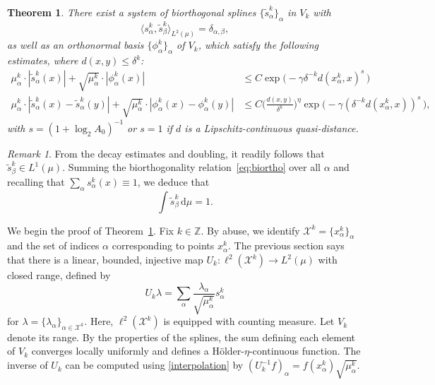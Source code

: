 \documentclass{amsart}
\numberwithin{equation}{section}
\theoremstyle{plain}
\newtheorem{theorem}[equation]{Theorem}
\theoremstyle{definition}
\theoremstyle{remark}
\newtheorem{remark}[equation]{Remark}
\begin{document}
{{\begin{theorem}\label{thm:biortho}
There exist a system of biorthogonal splines $\{\tilde{s}^k_\alpha\}_\alpha$ in $V_k$ with
\begin{equation}\label{eq:biortho}
\langle s^k_{\alpha}, \tilde s^k_{\beta}\rangle_{L^2(\mu)}= \delta _{\alpha,\beta},
\end{equation}
as well as an orthonormal basis $\{\phi^k_\alpha\}_\alpha$ of $V_k$, which satisfy the following estimates, 
where 
$d(x,y)\leq\delta^k$:
\begin{equation*}
\begin{split}
  \mu^k_{\alpha}\cdot{|{\tilde s^k_{\alpha}(x)}|}
  +\sqrt{\mu^k_{\alpha}}\cdot{|{\phi^k_{\alpha}(x)}|}
  &\leq C\exp\big(-\gamma {{\delta^{-k}}{d(x^k_{\alpha},x)}}^s\, \big) \\
  \mu^k_{\alpha}\cdot{|{\tilde s^k_{\alpha}(x)-\tilde s^k_\alpha(y)}|}
  +\sqrt{\mu^k_{\alpha}}\cdot{|{\phi^k_{\alpha}(x)-\phi^k_\alpha(y)}|}
  &\leq C\Big(\frac{d(x,y)}{\delta^k}\Big)^{\eta} \exp\big( -\gamma (\delta ^{-k}{d(x^k_{\alpha},x)})^s\, \big),
\end{split}
\end{equation*}
with  $s=(1+\log_{2}A_{0})^{-1}$ or $s=1$ if $d$ is a Lipschitz-continuous quasi-distance.
\end{theorem}

\begin{remark}
From the decay estimates and doubling, it readily follows that $\tilde{s}^k_\beta\in L^1(\mu)$. Summing the biorthogonality relation~\eqref{eq:biortho} over all $\alpha$ and recalling that $\sum_\alpha s^k_\alpha(x)\equiv 1$, we deduce that
\begin{equation*}
  \int \tilde{s}^k_\beta{\,\mathrm{d}}\mu = 1.
\end{equation*}
\end{remark}

We begin the proof of Theorem~\ref{thm:biortho}. Fix $k\in{\mathbb{Z}}$. By abuse, we identify $\mathscr{X}^k=\{x^k_{\alpha}\}_{\alpha}$ and the set of indices $\alpha$ corresponding to points $x^k_{\alpha}$. The previous section says that there is a linear,  bounded, injective map
$U_{k}\colon\ell^2(\mathscr{X}^{k}) \to L^2(\mu)$  with closed range, defined by \begin{equation*}U_{k}\lambda= \sum_{\alpha} \frac{\lambda_{\alpha}}{\sqrt {\mu^k_{\alpha}}} s^k_{\alpha}
\end{equation*} for 
$\lambda=\{\lambda_{\alpha}\}_{\alpha\in \mathscr{X}^{k}}$.  Here, $\ell^2(\mathscr{X}^{k})$  is equipped with counting measure. Let $V_{k}$ denote its  range. 
By the properties of the splines, the sum defining each element of $V_{k}$ converges locally uniformly and  defines a H\"older-$\eta$-continuous function. 
The inverse of $U_{k}$ can be computed using \eqref{interpolation} by 
$(U_{k}^{-1}f)_{\alpha}= f(x^k_{\alpha}) \sqrt{\mu^k_{\alpha}}$. 

}}
\end{document}
